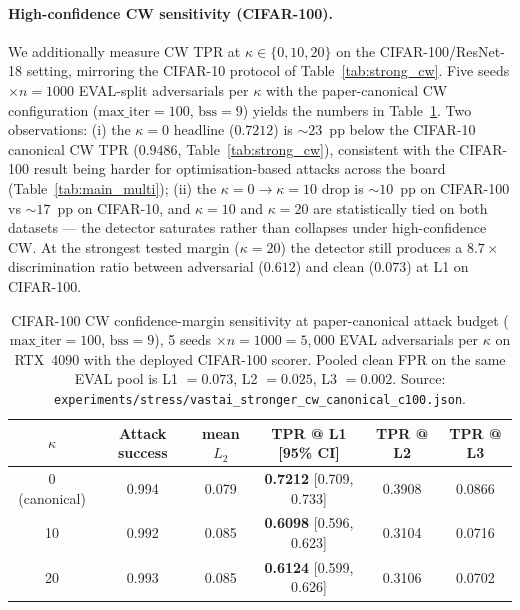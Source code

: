 \paragraph{High-confidence CW sensitivity (CIFAR-100).}
We additionally measure CW TPR at $\kappa \in \{0, 10, 20\}$ on the
CIFAR-100/ResNet-18 setting, mirroring the CIFAR-10 protocol of
Table~\ref{tab:strong_cw}. Five seeds $\times n{=}1000$ EVAL-split
adversarials per $\kappa$ with the paper-canonical CW configuration
($\text{max\_iter}{=}100$, $\text{bss}{=}9$) yields the numbers in
Table~\ref{tab:strong_cw_c100}. Two observations: (i) the $\kappa{=}0$
headline ($0.7212$) is $\sim 23$~pp below the CIFAR-10 canonical CW
TPR ($0.9486$, Table~\ref{tab:strong_cw}), consistent with the
CIFAR-100 result being harder for optimisation-based attacks across
the board (Table~\ref{tab:main_multi}); (ii) the $\kappa{=}0 \to
\kappa{=}10$ drop is $\sim 10$~pp on CIFAR-100 vs $\sim 17$~pp on
CIFAR-10, and $\kappa{=}10$ and $\kappa{=}20$ are statistically tied
on both datasets --- the detector saturates rather than collapses
under high-confidence CW. At the strongest tested margin
($\kappa{=}20$) the detector still produces a $8.7{\times}$
discrimination ratio between adversarial ($0.612$) and clean
($0.073$) at L1 on CIFAR-100.

\begin{table}[h]
\centering
\small
\begin{tabular}{cccccc}
\toprule
$\kappa$ & Attack success & mean $L_2$ & TPR @ L1 [95\% CI] & TPR @ L2 & TPR @ L3 \\
\midrule
0 (canonical)  & 0.994 & 0.079 & \textbf{0.7212} [0.709, 0.733] & 0.3908 & 0.0866 \\
10             & 0.992 & 0.085 & \textbf{0.6098} [0.596, 0.623] & 0.3104 & 0.0716 \\
20             & 0.993 & 0.085 & \textbf{0.6124} [0.599, 0.626] & 0.3106 & 0.0702 \\
\bottomrule
\end{tabular}
\caption{CIFAR-100 CW confidence-margin sensitivity at paper-canonical
attack budget ($\text{max\_iter}{=}100$, $\text{bss}{=}9$), 5 seeds
$\times n{=}1000 = 5{,}000$ EVAL adversarials per $\kappa$ on RTX~4090
with the deployed CIFAR-100 scorer. Pooled clean FPR on the same EVAL
pool is L1 $=0.073$, L2 $=0.025$, L3 $=0.002$. Source:
\texttt{experiments/stress/vastai\_stronger\_cw\_canonical\_c100.json}.}
\label{tab:strong_cw_c100}
\end{table}

